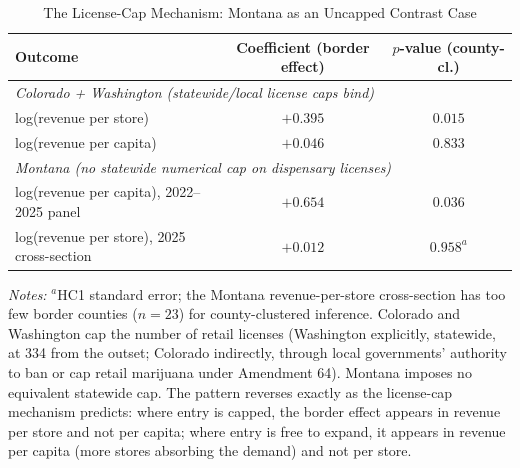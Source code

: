 \begin{table}[htbp]
\centering
\caption{The License-Cap Mechanism: Montana as an Uncapped Contrast Case}
\label{tab:a8_montana}
\small
\begin{tabular}{lcc}
\toprule
Outcome & Coefficient (border effect) & $p$-value (county-cl.) \\
\midrule
\multicolumn{3}{l}{\textit{Colorado + Washington (statewide/local license caps bind)}} \\
log(revenue per store) & $+0.395$ & $0.015$ \\
log(revenue per capita) & $+0.046$ & $0.833$ \\
\midrule
\multicolumn{3}{l}{\textit{Montana (no statewide numerical cap on dispensary licenses)}} \\
log(revenue per capita), 2022--2025 panel & $+0.654$ & $0.036$ \\
log(revenue per store), 2025 cross-section & $+0.012$ & $0.958^{a}$ \\
\bottomrule
\end{tabular}
\begin{minipage}{0.95\textwidth}
\vspace{0.3em}
\footnotesize
\textit{Notes:} $^{a}$HC1 standard error; the Montana revenue-per-store cross-section has too few border
counties ($n=23$) for county-clustered inference. Colorado and Washington cap the number of retail licenses
(Washington explicitly, statewide, at 334 from the outset; Colorado indirectly, through local governments'
authority to ban or cap retail marijuana under Amendment 64). Montana imposes no equivalent statewide cap.
The pattern reverses exactly as the license-cap mechanism predicts: where entry is capped, the border effect
appears in revenue per store and not per capita; where entry is free to expand, it appears in revenue per
capita (more stores absorbing the demand) and not per store.
\end{minipage}
\end{table}
